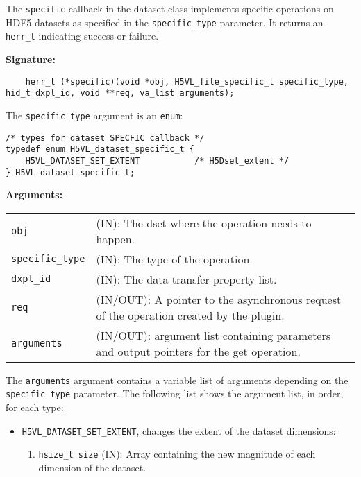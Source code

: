 The \texttt{specific} callback in the dataset class implements specific operations on HDF5 datasets as specified in the \texttt{specific\_type} parameter. It returns an \texttt{herr\_t} indicating success or failure.\bigskip

\begin{mdframed}[style=bgbox]
\textbf{Signature:}
\begin{lstlisting}
    herr_t (*specific)(void *obj, H5VL_file_specific_t specific_type, hid_t dxpl_id, void **req, va_list arguments);
\end{lstlisting}

The \texttt{specific\_type} argument is an \texttt{enum}:
\begin{lstlisting}
/* types for dataset SPECFIC callback */
typedef enum H5VL_dataset_specific_t {
    H5VL_DATASET_SET_EXTENT           /* H5Dset_extent */
} H5VL_dataset_specific_t;
\end{lstlisting}

\textbf{Arguments:}\\
\begin{tabular}{l p{10cm}}
  \texttt{obj} & (IN): The dset  where the operation needs
  to happen.\\
  \texttt{specific\_type} & (IN): The type of the operation.\\
  \texttt{dxpl\_id} & (IN): The data transfer property list.\\
  \texttt{req} & (IN/OUT): A pointer to the asynchronous request of the
  operation created by the plugin.\\
  \texttt{arguments} & (IN/OUT): argument list containing parameters and
  output pointers for the get operation. \\
\end{tabular}
\end{mdframed}

The \texttt{arguments} argument contains a variable list of arguments
depending on the \texttt{specific\_type} parameter. The following list shows
the argument list, in order, for each type:

\begin{itemize}
\item \texttt{H5VL\_DATASET\_SET\_EXTENT}, changes the extent of the dataset dimensions:
  \begin{enumerate}
  \item \texttt{hsize\_t size} (IN): Array containing the new magnitude of each dimension of the dataset. 
  \end{enumerate}
\end{itemize}

